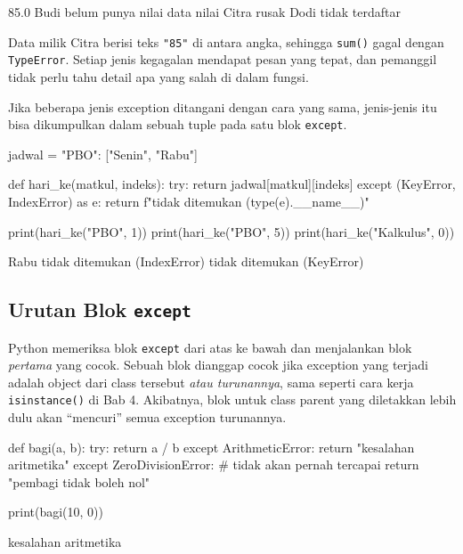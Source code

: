 \begin{keluaran}
85.0
Budi belum punya nilai
data nilai Citra rusak
Dodi tidak terdaftar
\end{keluaran}

Data milik Citra berisi teks \texttt{"85"} di antara angka, sehingga \texttt{sum()} gagal dengan \texttt{TypeError}. Setiap jenis kegagalan mendapat pesan yang tepat, dan pemanggil tidak perlu tahu detail apa yang salah di dalam fungsi.

Jika beberapa jenis exception ditangani dengan cara yang sama, jenis-jenis itu bisa dikumpulkan dalam sebuah tuple pada satu blok \texttt{except}.

\begin{kode}
jadwal = {"PBO": ["Senin", "Rabu"]}

def hari_ke(matkul, indeks):
    try:
        return jadwal[matkul][indeks]
    except (KeyError, IndexError) as e:
        return f"tidak ditemukan ({type(e).__name__})"

print(hari_ke("PBO", 1))
print(hari_ke("PBO", 5))
print(hari_ke("Kalkulus", 0))
\end{kode}

\begin{keluaran}
Rabu
tidak ditemukan (IndexError)
tidak ditemukan (KeyError)
\end{keluaran}

\subsection{Urutan Blok \texttt{except}}

Python memeriksa blok \texttt{except} dari atas ke bawah dan menjalankan blok \emph{pertama} yang cocok. Sebuah blok dianggap cocok jika exception yang terjadi adalah object dari class tersebut \emph{atau turunannya}, sama seperti cara kerja \texttt{isinstance()} di Bab 4. Akibatnya, blok untuk class parent yang diletakkan lebih dulu akan ``mencuri'' semua exception turunannya.

\begin{kode}
def bagi(a, b):
    try:
        return a / b
    except ArithmeticError:
        return "kesalahan aritmetika"
    except ZeroDivisionError:            # tidak akan pernah tercapai
        return "pembagi tidak boleh nol"

print(bagi(10, 0))
\end{kode}

\begin{keluaran}
kesalahan aritmetika
\end{keluaran}

